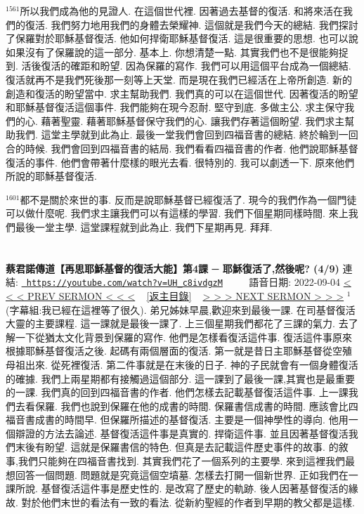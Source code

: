 \documentclass{book}
\begin{document}
$^{1561}$所以我們成為他的見證人.
在這個世代裡.
因著過去基督的復活.
和將來活在我們的復活.
我們努力地用我們的身體去榮耀神.
這個就是我們今天的總結.
我們探討了保羅對於耶穌基督復活.
他如何捍衛耶穌基督復活.
這是很重要的思想.
也可以說如果沒有了保羅說的這一部分.
基本上.
你想清楚一點.
其實我們也不是很能夠捉到.
活後復活的確距和盼望.
因為保羅的寫作.
我們可以用這個平台成為一個總結.
復活就再不是我們死後那一刻等上天堂.
而是現在我們已經活在上帝所創造.
新的創造和復活的盼望當中.
求主幫助我們.
我們真的可以在這個世代.
因著復活的盼望和耶穌基督復活這個事件.
我們能夠在現今忍耐.
堅守到底.
多做主公.
求主保守我們的心.
藉著聖靈.
藉著耶穌基督保守我們的心.
讓我們存著這個盼望.
我們求主幫助我們.
這堂主學就到此為止.
最後一堂我們會回到四福音書的總結.
終於輪到一回合的時候.
我們會回到四福音書的結局.
我們看看四福音書的作者.
他們說耶穌基督復活的事件.
他們會帶著什麼樣的眼光去看.
很特別的.
我可以劇透一下.
原來他們所說的耶穌基督復活.

$^{1601}$都不是關於來世的事.
反而是說耶穌基督已經復活了.
現今的我們作為一個門徒可以做什麼呢.
我們求主讓我們可以有這樣的學習.
我們下個星期同樣時間.
來上我們最後一堂主學.
這堂課程就到此為止.
我們下星期再見.
拜拜.
\newpage



\section{}
\label{sec:UH_c8ivdgzM}
\textbf{蔡君諾傳道【再思耶穌基督的復活大能】第4課 ─ 耶穌復活了,然後呢? (4/9)}
\newline
\newline
連結: \href{https://youtube.com/watch?v=UH_c8ivdgzM}{\texttt{ https://youtube.com/watch?v=UH\_c8ivdgzM}} ~~~~ 語音日期: 2022-09-04 
\newline
\newline
\hyperref[sec:A3YDD55lCCE]{\small{< < < PREV SERMON < < <}}
~
\hyperref[sec:index]{\small{[返主目錄]}}
~
\hyperref[sec:6Yg3FVlhsxs]{\small{> > > NEXT SERMON > > >}}
\newline
\newline
$^{1}$(字幕組:我已經在這裡等了很久).
弟兄姊妹早晨,歡迎來到最後一課.
在司基督復活大靈的主要課程.
這一課就是最後一課了.
上三個星期我們都花了三課的氣力.
去了解一下從猶太文化背景到保羅的寫作.
他們是怎樣看復活這件事.
復活這件事原來根據耶穌基督復活之後.
起碼有兩個層面的復活.
第一就是昔日主耶穌基督從空殖母祖出來.
從死裡復活.
第二件事就是在末後的日子.
神的子民就會有一個身體復活的確據.
我們上兩星期都有接觸過這個部分.
這一課到了最後一課,其實也是最重要的一課.
我們真的回到四福音書的作者.
他們怎樣去記載基督復活這件事.
上一課我們去看保羅.
我們也說到保羅在他的成書的時間.
保羅書信成書的時間.
應該會比四福音書成書的時間早.
但保羅所描述的基督復活.
主要是一個神學性的導向.
他用一個辯證的方法去論述.
基督復活這件事是真實的.
捍衛這件事.
並且因著基督復活我們末後有盼望.
這就是保羅書信的特色.
但真是去記載這件歷史事件的故事.
的敘事,我們只能夠在四福音書找到.
其實我們花了一個系列的主要學.
來到這裡我們最想回答一個問題.
問題就是究竟這個空墳墓.
怎樣去打開一個新世界.
正如我們在一課所說.
基督復活這件事是歷史性的.
是改寫了歷史的軌跡.
後人因著基督復活的緣故.
對於他們末世的看法有一致的看法.
從新約聖經的作者到早期的教父都是這樣.
\end{document}
